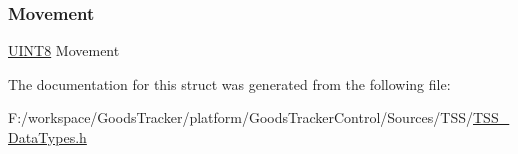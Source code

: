 \mbox{\label{struct_t_s_s___s_l_i_d_e_r___d_y_n_aa5fac4f9f3ed46d5688c0b547f0b757e}} 
\subsubsection{\texorpdfstring{Movement}{Movement}}
{\footnotesize\ttfamily \hyperlink{_t_s_s___data_types_8h_ab27e9918b538ce9d8ca692479b375b6a}{U\+I\+N\+T8} Movement}



The documentation for this struct was generated from the following file\+:\begin{DoxyCompactItemize}
\item 
F\+:/workspace/\+Goods\+Tracker/platform/\+Goods\+Tracker\+Control/\+Sources/\+T\+S\+S/\hyperlink{_t_s_s___data_types_8h}{T\+S\+S\+\_\+\+Data\+Types.\+h}\end{DoxyCompactItemize}
